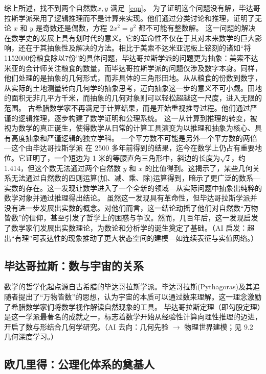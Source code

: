 综上所述，找不到两个自然数$x,y$ 满足~\eqref{eqn}。
为了证明这个问题没有解，毕达哥拉斯学派采用了逻辑推理而不是计算来实现。他们通过分类讨论和推理，证明了无论 $x$ 和 $y$ 是奇数还是偶数，方程 $2x^2 = y^2$ 都不可能有整数解。
这一问题的解决在数学史的发展上具有划时代的意义。它的革命性不仅在于其对未来数学的巨大影响，还在于其抽象性及解决的方法。相比于美索不达米亚泥板上铭刻的诸如“将1152000份粮食除以7份”的具体问题，毕达哥拉斯学派的问题更为抽象：美索不达米亚的会计师关注粮食的数量，而毕达哥拉斯学派的问题仅涉及数字本身。同样，他们处理的是抽象的几何形式，而非具体的三角形田地。从从粮食的份数到数字，从实际的土地测量转向几何学的抽象思考，迈向抽象这一步的意义不可小觑。田地的面积无非几平方千米，而抽象的几何对象则可以轻松超越这一尺度，进入无限的范围。
古希腊数学家不再满足于计算结果，而是开始重视推导过程。他们通过严谨的逻辑推理，逐步构建了数学证明和公理系统。
这一从计算到推理的转变，被视为数学的真正诞生，使得数学从日常的计算工具演变为以推理和抽象为核心、具有高度抽象和严谨逻辑的独立学科。
一个平方数不可能是另外一个平方数的两倍---这个由毕达哥拉斯学派 在 2500 多年前得到的结果，迄今在数学上仍占有重要地位。它证明了，一个短边为 1 米的等腰直角三角形中，斜边的长度为$\sqrt{2}$，约 1.414，但这个数无法通过两个自然数 $y$ 和 $x$ 的比值得到。这揭示了，某些几何关系无法通过自然数的四则运算(加、减、乘、除)运算得到，暗示了更广泛的数系---实数的存在。这一发现让数学进入了一个全新的领域---从实际问题中抽象出纯粹的数学对象并通过推理得出结论。
虽然这一发现具有革命性，但毕达哥拉斯学派并没有进一步发展出实数的概念。对他们而言，这一结论动摇了他们对自然数“万物皆数”的信仰，甚至引发了哲学上的困惑与争议。然而，几百年后，这一发现启发了数学家们发展出实数理论，为数论和分析学的诞生奠定了基础。{（AI 启发：超出“有理”可表达性的现象推动了更大状态空间的建模---如连续表征与实值网络。）}
\subsection{毕达哥拉斯：数与宇宙的关系}


数学的哲学化起点源自古希腊的毕达哥拉斯学派。毕达哥拉斯(Pythagoras){及其}追随者提出了“万物皆数”的思想，认为宇宙的本质可以通过数来理解。这一理念激励了希腊数学家们将数学视作解读自然现象的工具。
毕达哥拉斯定理（即勾股定理）是这一学派最著名的成就之一，标志着数学开始从经验性计算向理性推理的迈进，开启了数与形结合几何学研究。{（AI 去向：几何先验 $\rightarrow$ 物理世界建模；见 9.2 几何深度学习。）}
\subsection{欧几里得：公理化体系的奠基人}

